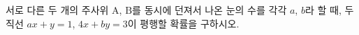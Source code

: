 서로 다른 두 개의 주사위 $\mathrm{A}$, $\mathrm{B}$를 동시에 던져서 나온 눈의 수를 각각 $a$, $b$라 할 때, 두 직선 $ax+y=1$, $4x+by=3$이 평행할 확률을 구하시오.
